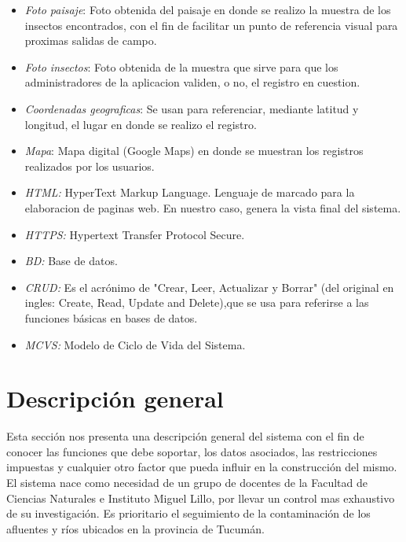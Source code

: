 \begin{itemize}
        \item \emph{Foto paisaje}: Foto obtenida del paisaje en donde se realizo la muestra de los insectos encontrados, con el fin de facilitar un punto de referencia visual para proximas salidas de campo.
        
        \item \emph{Foto insectos}: Foto obtenida de la muestra que sirve para que los administradores de la aplicacion validen, o no, el registro en cuestion.
        
        \item \emph{Coordenadas geograficas}: Se usan para referenciar, mediante latitud y longitud, el lugar en donde se realizo el registro.
        
        \item \emph{Mapa}: Mapa digital (Google Maps) en donde se muestran los registros realizados por los usuarios.
        
        \item \emph{HTML:} HyperText Markup Language. Lenguaje de marcado para la elaboracion de paginas web. En nuestro caso, genera la vista final del sistema.
        
        \item \emph{HTTPS:} Hypertext Transfer Protocol Secure.
        
        \item \emph{BD:} Base de datos.
        
        \item \emph{CRUD:} Es el acrónimo de "Crear, Leer, Actualizar y Borrar" (del original en ingles: Create, Read, Update and Delete),que se usa para referirse a las funciones básicas en bases de datos.
        
        \item \emph{MCVS:} Modelo de Ciclo de Vida del Sistema.
      \end{itemize}

  \section{Descripción general}

    Esta sección nos presenta una descripción general del sistema con el fin de conocer las funciones que debe soportar, los datos asociados, las restricciones impuestas y cualquier otro factor que pueda influir en la construcción del mismo.
    El sistema nace como necesidad de un grupo de docentes de la Facultad de Ciencias Naturales e Instituto Miguel Lillo, por llevar un control mas exhaustivo de su investigación.
    Es prioritario el seguimiento de la contaminación de los afluentes y ríos ubicados en la provincia de Tucumán.

